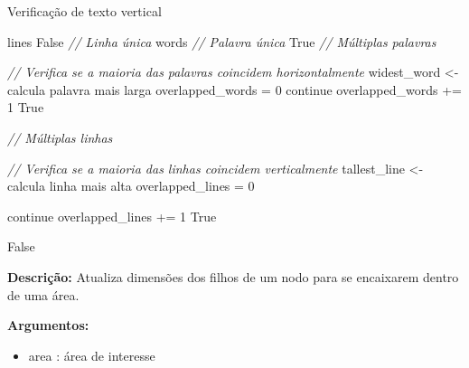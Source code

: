 \begin{algorithm}[H]
	\caption{Verificação de texto vertical}
	\tiny
	\begin{algorithmic}[1]
			\STATE lines
				\RETURN False
			\ENDIF
			\STATE \textit{// Linha única}
				\STATE words
			 \STATE \textit{// Palavra única}
						\RETURN True
					\ENDIF
				\STATE \textit{// Múltiplas palavras} 
				
				\Else
					\STATE \textit{// Verifica se a maioria das palavras coincidem horizontalmente}
					\STATE widest\_word <- calcula palavra mais larga
					\STATE overlapped\_words = 0
							\STATE continue
						\ENDIF
							\STATE overlapped\_words += 1
						\ENDIF
					\ENDFOR
						\RETURN True
					\ENDIF
					
				\ENDIF
				
			\STATE \textit{// Múltiplas linhas} 
			
			\Else
				\STATE \textit{// Verifica se a maioria das linhas coincidem verticalmente}
				\STATE tallest\_line <- calcula linha mais alta
				\STATE overlapped\_lines = 0
				
						\STATE continue
					\ENDIF
						\STATE overlapped\_lines += 1
					\ENDIF
				\ENDFOR
					\RETURN True
				\ENDIF
			
			\ENDIF
			
		\ENDIF
		
		\RETURN	False
		
	\end{algorithmic}
\end{algorithm}




\textbf{Descrição:} Atualiza dimensões dos filhos de um nodo para se encaixarem dentro de uma área.


\textbf{Argumentos:}
\begin{itemize}\setlength\itemsep{-0.3em}
	\item area : área de interesse
\end{itemize}


